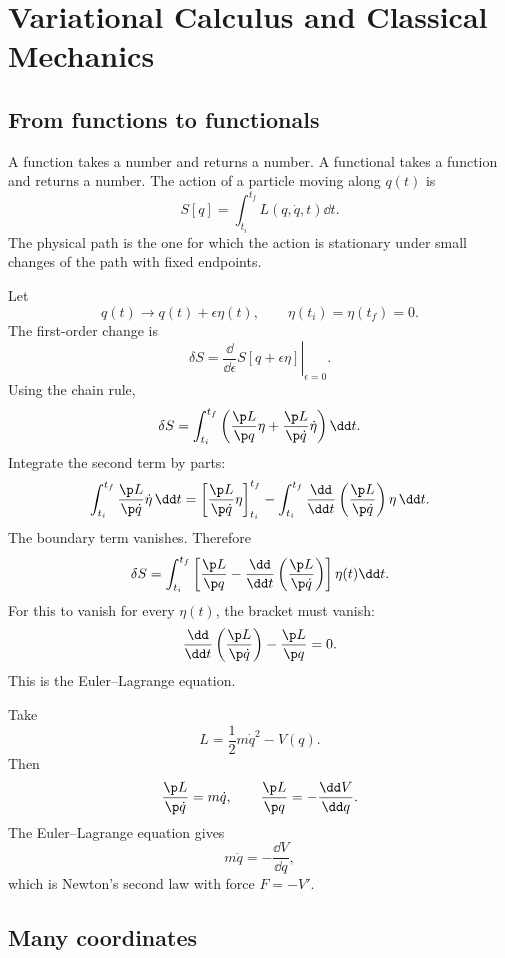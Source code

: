 \chapter{Variational Calculus and Classical Mechanics}

\section{From functions to functionals}

A function takes a number and returns a number.  A functional takes a function and returns a number.  The action of a particle moving along \(q(t)\) is
\[
  S[q]=\int_{t_i}^{t_f}L(q,\dot q,t)\dd t.
\]
The physical path is the one for which the action is stationary under small changes of the path with fixed endpoints.

Let
\[
  q(t)\to q(t)+\epsilon\eta(t),
  \qquad
  \eta(t_i)=\eta(t_f)=0.
\]
The first-order change is
\[
  \delta S
  =
  \left.\frac{\dd}{\dd\epsilon}S[q+\epsilon\eta]\right|_{\epsilon=0}.
\]
Using the chain rule,
\[
  \delta S
  =
  \int_{t_i}^{t_f}
  \left(
  \frac{\p L}{\p q}\eta
  +
  \frac{\p L}{\p\dot q}\dot\eta
  \right)\dd t.
\]
Integrate the second term by parts:
\[
  \int_{t_i}^{t_f}\frac{\p L}{\p\dot q}\dot\eta\,\dd t
  =
  \left[\frac{\p L}{\p\dot q}\eta\right]_{t_i}^{t_f}
  -
  \int_{t_i}^{t_f}
  \frac{\dd}{\dd t}\left(\frac{\p L}{\p\dot q}\right)\eta\,\dd t.
\]
The boundary term vanishes.  Therefore
\[
  \delta S
  =
  \int_{t_i}^{t_f}
  \left[
  \frac{\p L}{\p q}
  -
  \frac{\dd}{\dd t}\left(\frac{\p L}{\p\dot q}\right)
  \right]\eta(t)\dd t.
\]
For this to vanish for every \(\eta(t)\), the bracket must vanish:
\[
  \frac{\dd}{\dd t}\left(\frac{\p L}{\p\dot q}\right)-\frac{\p L}{\p q}=0.
\]
This is the Euler--Lagrange equation.

\begin{example}
Take
\[
  L=\frac12m\dot q^2-V(q).
\]
Then
\[
  \frac{\p L}{\p\dot q}=m\dot q,\qquad
  \frac{\p L}{\p q}=-\frac{\dd V}{\dd q}.
\]
The Euler--Lagrange equation gives
\[
  m\ddot q=-\frac{\dd V}{\dd q},
\]
which is Newton's second law with force \(F=-V'\).
\end{example}

\section{Many coordinates}

